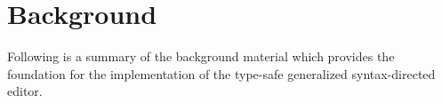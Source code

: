 \chapter{Background}
\label{ch:background}
Following is a summary of the background material which provides
the foundation for the implementation of the type-safe generalized syntax-directed editor.


